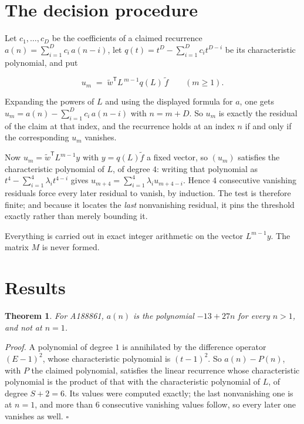 \documentclass[11pt]{article}
\newtheorem{theorem}{Theorem}
\theoremstyle{definition}
\begin{document}
\section{The decision procedure}

Let $c_1,\dots,c_D$ be the coefficients of a claimed recurrence $a(n) = \sum_{i=1}^{D} c_i\,a(n-i)$, let $q(t) = t^{D} - \sum_{i=1}^{D} c_i t^{D-i}$ be its characteristic polynomial, and put

\[u_m \;=\; \tilde w^{\mathsf T} L^{\,m-1} q(L)\,\tilde f \qquad (m \ge 1).\]

Expanding the powers of $L$ and using the displayed formula for $a$, one gets $u_m = a(n) - \sum_{i=1}^{D} c_i\,a(n-i)$ with $n = m + D$. So $u_m$ is exactly the residual of the claim at that index, and the recurrence holds at an index $n$ if and only if the corresponding $u_m$ vanishes.

Now $u_m = \tilde w^{\mathsf T} L^{m-1} y$ with $y = q(L)\tilde f$ a fixed vector, so $(u_m)$ satisfies the characteristic polynomial of $L$, of degree $4$: writing that polynomial as $t^{4} - \sum_{i=1}^{4} \lambda_i t^{4-i}$ gives $u_{m+4} = \sum_{i=1}^{4} \lambda_i u_{m+4-i}$. Hence $4$ consecutive vanishing residuals force every later residual to vanish, by induction. The test is therefore finite; and because it locates the {\itshape last} nonvanishing residual, it pins the threshold exactly rather than merely bounding it.

Everything is carried out in exact integer arithmetic on the vector $L^{m-1}y$. The matrix $M$ is never formed.

\section{Results}

\begin{theorem} For A188861, $a(n)$ is the polynomial $-13 + 27n$ for every $n > 1$, and not at $n = 1$.\end{theorem}

{\itshape Proof.} A polynomial of degree $1$ is annihilated by the difference operator $(E-1)^{2}$, whose characteristic polynomial is $(t-1)^{2}$. So $a(n) - P(n)$, with $P$ the claimed polynomial, satisfies the linear recurrence whose characteristic polynomial is the product of that with the characteristic polynomial of $L$, of degree $S + 2 = 6$. Its values were computed exactly; the last nonvanishing one is at $n = 1$, and more than $6$ consecutive vanishing values follow, so every later one vanishes as well. $\square$
\end{document}
